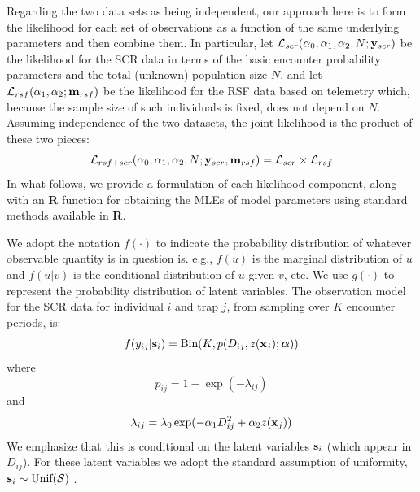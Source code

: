 \documentclass[12pt]{article}
\begin{document}
Regarding the two data sets as being independent, our approach here
is to form the likelihood for each set of observations as a function
of the same underlying parameters and then combine them. In
particular, let ${\cal L}_{scr}(\alpha_{0}, \alpha_{1}, \alpha_{2}, N;
{\bf y}_{scr})$
be the likelihood for the SCR data in terms of the basic encounter
probability parameters and the total (unknown) population size $N$,
and let ${\cal L}_{rsf}(\alpha_{1},\alpha_{2}; {\bf m}_{rsf})$ be the
likelihood for the RSF data based on telemetry which, because the
sample size of such individuals is fixed, does not depend on $N$.
Assuming independence of the two datasets, the
joint likelihood is the product of these two pieces:
\[
{\cal L}_{rsf+scr}(\alpha_{0},\alpha_{1},\alpha_{2},N; {\bf y}_{scr},{\bf
  m}_{rsf})  = {\cal L}_{scr} \times {\cal L}_{rsf}
\]
In what follows, we provide a formulation of each likelihood
component, along with an {\bf R} function for obtaining the MLEs of
model parameters using standard methods available in {\bf R}.


We adopt the notation $f(\cdot)$ to indicate the probability
distribution of whatever observable quantity is in question is. e.g., $f(u)$ is
the marginal distribution of $u$ and $f(u|v)$ is the conditional
distribution of $u$ given $v$, etc. We use $g(\cdot)$ to represent the
probability distribution of latent variables. 
The observation model for the SCR data for individual $i$ and trap $j$,
from sampling over $K$ encounter periods, is:
\begin{equation}
f(y_{ij}| {\bf s}_{i}) = \mbox{Bin}(K, p(D_{ij}, z({\bf x}_{j}); {\bm \alpha}))
\label{rsf.mle.eq.cond-on-s}
\end{equation}
where
\[
 p_{ij} = 1-\exp(- \lambda_{ij} )
\]
and
\[
 \lambda_{ij} = \lambda_{0} \exp(- \alpha_{1} D_{ij}^{2} + \alpha_{2}
 z({\bf x}_{j}) )
\]
We emphasize that this is conditional on the latent variables ${\bf
  s}_{i}$ (which appear in $D_{ij}$). For these latent variables we
adopt the standard assumption of uniformity, ${\bf s}_{i} \sim
\mbox{Unif}({\cal S})$ \citep{royle_young:2008}.
\end{document}
